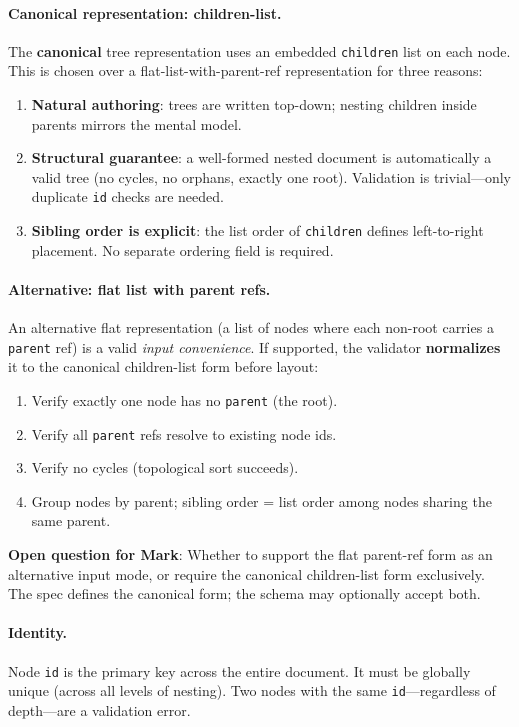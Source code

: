 \paragraph{Canonical representation: children-list.}
The \textbf{canonical} tree representation uses an embedded \texttt{children} list on each node. This is chosen over a flat-list-with-parent-ref representation for three reasons:
\begin{enumerate}
  \item \textbf{Natural authoring}: trees are written top-down; nesting children inside parents mirrors the mental model.
  \item \textbf{Structural guarantee}: a well-formed nested document is automatically a valid tree (no cycles, no orphans, exactly one root). Validation is trivial---only duplicate \texttt{id} checks are needed.
  \item \textbf{Sibling order is explicit}: the list order of \texttt{children} defines left-to-right placement. No separate ordering field is required.
\end{enumerate}

\paragraph{Alternative: flat list with parent refs.}
An alternative flat representation (a list of nodes where each non-root carries a \texttt{parent} ref) is a valid \emph{input convenience}. If supported, the validator \textbf{normalizes} it to the canonical children-list form before layout:
\begin{enumerate}
  \item Verify exactly one node has no \texttt{parent} (the root).
  \item Verify all \texttt{parent} refs resolve to existing node ids.
  \item Verify no cycles (topological sort succeeds).
  \item Group nodes by parent; sibling order = list order among nodes sharing the same parent.
\end{enumerate}

\textbf{Open question for Mark}: Whether to support the flat parent-ref form as an alternative input mode, or require the canonical children-list form exclusively. The spec defines the canonical form; the schema may optionally accept both.

\paragraph{Identity.}
Node \texttt{id} is the primary key across the entire document. It must be globally unique (across all levels of nesting). Two nodes with the same \texttt{id}---regardless of depth---are a validation error.

